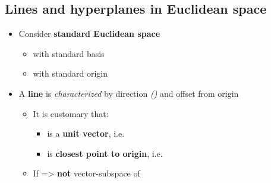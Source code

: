 \subsection*{\texorpdfstring{Lines and hyperplanes in Euclidean space
    }{Lines and hyperplanes in Euclidean space }}

\begin{itemize}

  \item
        Consider \textbf{standard Euclidean space}

        \begin{itemize}

          \item
                with standard basis
          \item
                with standard origin 
        \end{itemize}
  \item
        A \textbf{line}  is
        \emph{characterized} by direction
        \emph{()} and offset from origin

        \begin{itemize}

          \item
                It is customary that:

                \begin{itemize}

                  \item
                         is a \textbf{unit vector},
                        i.e.~
                  \item
                         is \textbf{closest point to origin},
                        i.e.~
                \end{itemize}
          \item
                If  =\textgreater{}
                 \textbf{not} vector-subspace of 


\end{itemize}
\end{itemize}
